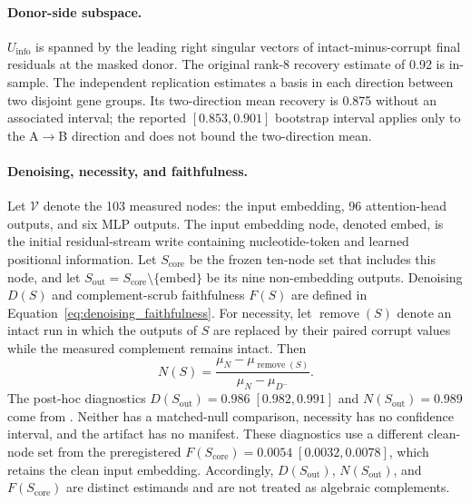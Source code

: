 \documentclass{article}
\newcommand{\Uinfo}{\ensuremath{U_{\mathrm{info}}}}
\begin{document}
\paragraph{Donor-side subspace.}
\Uinfo{} is spanned by the leading right singular vectors of intact-minus-corrupt final residuals at the masked donor. The original rank-8 recovery estimate of 0.92 is in-sample. The independent replication estimates a basis in each direction between two disjoint gene groups. Its two-direction mean recovery is 0.875 without an associated interval; the reported \([0.853,0.901]\) bootstrap interval applies only to the A\(\rightarrow\)B direction and does not bound the two-direction mean.

\paragraph{Denoising, necessity, and faithfulness.}
Let \(\mathcal{V}\) denote the 103 measured nodes: the input embedding, 96 attention-head outputs, and six MLP outputs. The input embedding node, denoted \(\mathrm{embed}\), is the initial residual-stream write containing nucleotide-token and learned positional information. Let \(S_{\mathrm{core}}\) be the frozen ten-node set that includes this node, and let \(S_{\mathrm{out}}=S_{\mathrm{core}}\setminus\{\mathrm{embed}\}\) be its nine non-embedding outputs. Denoising \(D(S)\) and complement-scrub faithfulness \(F(S)\) are defined in Equation~\ref{eq:denoising_faithfulness}. For necessity, let \(\operatorname{remove}(S)\) denote an intact run in which the outputs of \(S\) are replaced by their paired corrupt values while the measured complement remains intact. Then
\begin{equation}
N(S)
=
\frac{\mu_N-\mu_{\operatorname{remove}(S)}}
     {\mu_N-\mu_{D^-}} .
\label{eq:necessity}
\end{equation}
The post-hoc diagnostics \(D(S_{\mathrm{out}})=0.986\;[0.982,0.991]\) and \(N(S_{\mathrm{out}})=0.989\) come from . Neither has a matched-null comparison, necessity has no confidence interval, and the artifact has no manifest. These diagnostics use a different clean-node set from the preregistered \(F(S_{\mathrm{core}})=0.0054\;[0.0032,0.0078]\), which retains the clean input embedding. Accordingly, \(D(S_{\mathrm{out}})\), \(N(S_{\mathrm{out}})\), and \(F(S_{\mathrm{core}})\) are distinct estimands and are not treated as algebraic complements.
\end{document}
